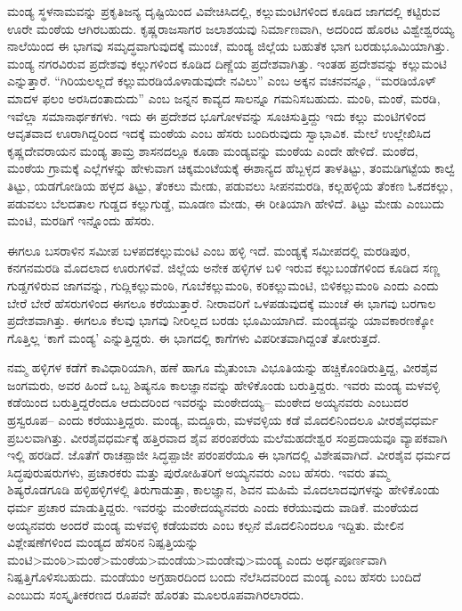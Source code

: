 ಮಂಡ್ಯ ಸ್ಥಳನಾಮವನ್ನು ಪ್ರಕೃತಿಜನ್ಯ ದೃಷ್ಟಿಯಿಂದ ವಿವೇಚಿಸಿದಲ್ಲಿ, ಕಲ್ಲುಮಂಟಿಗಳಿಂದ ಕೂಡಿದ ಜಾಗದಲ್ಲಿ ಕಟ್ಟಿರುವ ಊರೇ ಮಂಠೆಯ ಆಗಿರಬಹುದು. ಕೃಷ್ಣರಾಜಸಾಗರ ಜಲಾಶಯವು ನಿರ್ಮಾಣವಾಗಿ, ಅದರಿಂದ ಹೊರಟ ವಿಶ್ವೇಶ್ವರಯ್ಯ ನಾಲೆಯಿಂದ ಈ ಭಾಗವು ಸಮೃದ್ಧವಾಗುವುದಕ್ಕೆ ಮುಂಚೆ, ಮಂಡ್ಯ ಜಿಲ್ಲೆಯ ಬಹುತೆಕ ಭಾಗ ಬರಡುಭೂಮಿಯಾಗಿತ್ತು. ಮಂಡ್ಯ ನಗರವಿರುವ ಪ್ರದೇಶವು ಕಲ್ಲುಗಳಿಂದ ಕೂಡಿದ ದಿಣ್ಣೆಯ ಪ್ರದೇಶವಾಗಿತ್ತು. ಇಂತಹ ಪ್ರದೇಶವನ್ನು ಕಲ್ಲುಮಂಟಿ ಎನ್ನುತ್ತಾರೆ. “ಗಿರಿಯಲಲ್ಲದೆ ಕಲ್ಲುಮರಡಿಯೊಳಾಡುವುದೇ ನವಿಲು” ಎಂಬ ಅಕ್ಕನ ವಚನವನ್ನೂ, “ಮರಡಿಯೊಳ್​ ಮಾದಳ ಫಲಂ ಅರಸಿದಂತಾದುದು” ಎಂಬ ಜನ್ನನ ಕಾವ್ಯದ ಸಾಲನ್ನೂ ಗಮನಿಸಬಹುದು. ಮಂಠಿ, ಮಂಠೆ, ಮರಡಿ, ಇವೆಲ್ಲಾ ಸಮಾನಾರ್ಥಕಗಳು. ಇದು ಈ ಪ್ರದೇಶದ ಭೂಗೋಳವನ್ನು ಸೂಚಿಸುತ್ತಿದ್ದು ಇದು ಕಲ್ಲು ಮಂಟಿಗಳಿಂದ ಆವೃತವಾದ ಊರಾಗಿದ್ದರಿಂದ ಇದಕ್ಕೆ ಮಂಠೆಯ ಎಂಬ ಹೆಸರು ಬಂದಿರುವುದು ಸ್ವಾಭಾವಿಕ. ಮೇಲೆ ಉಲ್ಲೇಖಿಸಿದ ಕೃಷ್ಣದೇವರಾಯನ ಮಂಡ್ಯ ತಾಮ್ರ ಶಾಸನದಲ್ಲೂ ಕೂಡಾ ಮಂಡ್ಯವನ್ನು ಮಂಠೆಯ ಎಂದೇ ಹೇಳಿದೆ. ಮಂಠೆದ, ಮಂಠೆಯ ಗ್ರಾಮಕ್ಕೆ ಎಲ್ಲೆಗಳನ್ನು ಹೇಳುವಾಗ ಚಿಕ್ಕಮಂಟೆಯಕ್ಕೆ ಈಶಾನ್ಯದ ಹೆಬ್ಬಳ್ಳದ ತಾಳತಿಟ್ಟು, ತಂಮಡಿಗಟ್ಟೆಯ ಕಾಲ್ವೆ ತಿಟ್ಟು, ಯಡಗೋಡಿಯ ಹಳ್ಳದ ತಿಟ್ಟು, ತೆಂಕಲು ಮೇಡು, ಪಡುವಲು ಸೀಪನಮರಡಿ, ಕಲ್ಲಹಳ್ಳಿಯ ತೆಂಕಣ ಓಕದಕಲ್ಲು, ಪಡುವಲು ಬೆಲದತಾಲ ಗುಡ್ಡದ ಕಲ್ಲುಗುಡ್ಡೆ, ಮೂಡಣ ಮೇಡು, ಈ ರೀತಿಯಾಗಿ ಹೇಳಿದೆ. ತಿಟ್ಟು ಮೇಡು ಎಂಬುದು ಮಂಟಿ, ಮರಡಿಗೆ ಇನ್ನೊಂದು ಹೆಸರು.

ಈಗಲೂ ಬಸರಾಳಿನ ಸಮೀಪ ಬಳಪದಕಲ್ಲುಮಂಟಿ ಎಂಬ ಹಳ್ಳಿ ಇದೆ. ಮಂಡ್ಯಕ್ಕೆ ಸಮೀಪದಲ್ಲಿ ಮರಡಿಪುರ, ಕನಗನಮರಡಿ ಮೊದಲಾದ ಊರುಗಳಿವೆ. ಜಿಲ್ಲೆಯ ಅನೇಕ ಹಳ್ಳಿಗಳ ಬಳಿ ಇರುವ ಕಲ್ಲುಬಂಡೆಗಳಿಂದ ಕೂಡಿದ ಸಣ್ಣ ಗುಡ್ಡಗಳಿರುವ ಜಾಗವನ್ನು, ಗುದ್ಲಿಕಲ್ಲುಮಂಠಿ, ಗೂಬೆಕಲ್ಲುಮಂಠಿ, ಕರಿಕಲ್ಲುಮಂಟಿ, ಬಿಳಿಕಲ್ಲುಮಂಠಿ ಎಂದು ಎಂದು ಬೇರೆ ಬೇರೆ ಹೆಸರುಗಳಿಂದ ಈಗಲೂ ಕರೆಯುತ್ತಾರೆ. ನೀರಾವರಿಗೆ ಒಳಪಡುವುದಕ್ಕೆ ಮುಂಚೆ ಈ ಭಾಗವು ಬರಗಾಲ ಪ್ರದೇಶವಾಗಿತ್ತು. ಈಗಲೂ ಕೆಲವು ಭಾಗವು ನೀರಿಲ್ಲದ ಬರಡು ಭೂಮಿಯಾಗಿದೆ. ಮಂಡ್ಯವನ್ನು ಯಾವಕಾರಣಕ್ಕೋ ಗೊತ್ತಿಲ್ಲ ‘ಕಾಗೆ ಮಂಡ್ಯ’ ಎನ್ನುತ್ತಿದ್ದರು. ಈ ಭಾಗದಲ್ಲಿ ಕಾಗೆಗಳು ವಿಪರೀತವಾಗಿದ್ದಂತೆ ತೋರುತ್ತದೆ.

\newpage

ನಮ್ಮ ಹಳ್ಳಿಗಳ ಕಡೆಗೆ ಕಾವಿಧಾರಿಯಾಗಿ, ಹಣೆ ಹಾಗೂ ಮೈತುಂಬಾ ವಿಭೂತಿಯನ್ನು ಹಚ್ಚಿಕೊಂಡಿರುತ್ತಿದ್ದ, ವೀರಶೈವ ಜಂಗಮರು, ಅವರ ಹಿಂದೆ ಒಬ್ಬ ಶಿಷ್ಯನೂ ಕಾಲಜ್ಞಾನವನ್ನು ಹೇಳಿಕೊಂಡು ಬರುತ್ತಿದ್ದರು. ಇವರು ಮಂಡ್ಯ ಮಳವಳ್ಳಿ ಕಡೆಯಿಂದ ಬರುತ್ತಿದ್ದರೆಂದೂ ಆದುದರಿಂದ ಇವರನ್ನು ಮಂಠೇದಯ್ಯ– ಮಂಠೇದ ಅಯ್ಯನವರು ಎಂಬುದರ ಹ್ರಸ್ವರೂಪ– ಎಂದು ಕರೆಯುತ್ತಿದ್ದರು. ಮಂಡ್ಯ, ಮದ್ದೂರು, ಮಳವಳ್ಳಿಯ ಕಡೆ ಮೊದಲಿನಿಂದಲೂ ವೀರಶೈವಧರ್ಮ ಪ್ರಬಲವಾಗಿತ್ತು. ವೀರಶೈವಧರ್ಮಕ್ಕೆ ಹತ್ತಿರವಾದ ಶೈವ ಪರಂಪರೆಯ ಮಲೆಮಹದೇಶ್ವರ ಸಂಪ್ರದಾಯವೂ ವ್ಯಾಪಕವಾಗಿ ಇಲ್ಲಿ ಹರಡಿದೆ. ಜೊತೆಗೆ ರಾಚಪ್ಪಾಜೀ ಸಿದ್ಧಪ್ಪಾಜೀ ಪರಂಪರೆಯೂ ಈ ಭಾಗದಲ್ಲಿ ವಿಶೇಷವಾಗಿದೆ. ವೀರಶೈವ ಧರ್ಮದ ಸಿದ್ಧಪುರುಷರುಗಳು, ಪ್ರಚಾರಕರು ಮತ್ತು ಪುರೋಹಿತರಿಗೆ ಅಯ್ಯನವರು ಎಂಬ ಹೆಸರು. ಇವರು ತಮ್ಮ ಶಿಷ್ಯರೊಡಗೂಡಿ ಹಳ್ಳಿಹಳ್ಳಿಗಳಲ್ಲಿ ತಿರುಗಾಡುತ್ತಾ, ಕಾಲಜ್ಞಾನ, ಶಿವನ ಮಹಿಮೆ ಮೊದಲಾದವುಗಳನ್ನು ಹೇಳಿಕೊಂಡು ಧರ್ಮ ಪ್ರಚಾರ ಮಾಡುತ್ತಿದ್ದರು. ಇವರನ್ನು ಮಂಠೇದಯ್ಯನವರು ಎಂದು ಕರೆಯುವುದು ವಾಡಿಕೆ. ಮಂಠೆಯದ ಅಯ್ಯನವರು ಅಂದರೆ ಮಂಡ್ಯ ಮಳವಳ್ಳಿ ಕಡೆಯವರು ಎಂಬ ಕಲ್ಪನೆ ಮೊದಲಿನಿಂದಲೂ ಇದ್ದಿತು. ಮೇಲಿನ ವಿಶ್ಲೇಷಣೆಗಳಿಂದ ಮಂಡ್ಯದ ಹೆಸರಿನ ನಿಷ್ಪತ್ತಿಯನ್ನು ಮಂಟಿ\textgreater  ಮಂಠಿ\textgreater  ಮಂಠೆ\textgreater  ಮಂಠೆಯ\textgreater  ಮಂಡೆಯ\textgreater  ಮಂಡೇವು\textgreater ಮಂಡ್ಯ ಎಂದು ಅರ್ಥಪೂರ್ಣವಾಗಿ ನಿಷ್ಪತ್ತಿಗೊಳಿಸಬಹುದು. ಮಂಡೆಯಂ ಅಗ್ರಹಾರದಿಂದ ಬಂದು ನೆಲೆಸಿದವರಿಂದ ಮಂಡ್ಯ ಎಂಬ ಹೆಸರು ಬಂದಿದೆ ಎಂಬುದು ಸಂಸ್ಕೃತೀಕರಣದ ರೂಪವೇ ಹೊರತು ಮೂಲರೂಪವಾಗಿರಲಾರದು.



